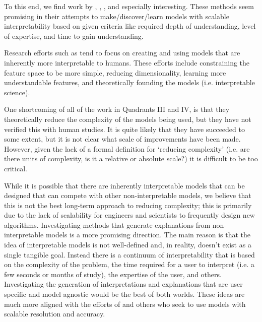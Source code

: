     To this end, we find work by \cite{Ruping2006-xj}, \cite{Van_Belle2012-dt}, \cite{Ribeiro2016-uc}, and \cite{Choi2016-by} especially interesting. These methods seem promising in their attempts to make/discover/learn models with scalable interpretability based on given criteria like required depth of understanding, level of expertise, and time to gain understanding. 
    
    Research efforts such as \cite{Caruana2015-za,Huysmans2011-th,Faghmous2014-og,Venna2007-yj,Vellido2012-nm,Kadous1999-rx,Lomas2012-ie} tend to focus on creating and using models that are inherently more interpretable to humans. These efforts include constraining the feature space to be more simple, reducing dimensionality, learning more understandable features, and theoretically founding the models (i.e. interpretable science).

    One shortcoming of all of the work in Quadrants III and IV, is that they theoretically reduce the complexity of the models being used, but they have not verified this with human studies. It is quite likely that they have succeeded to some extent, but it is not clear what scale of improvements have been made. However, given the lack of a formal definition for `reducing complexity' (i.e. are there units of complexity, is it a relative or absolute scale?) it is difficult to be too critical.
    
    While it is possible that there are inherently interpretable models that can be designed that can compete with other non-interpretable models, we believe that this is not the best long-term approach to reducing complexity; this is primarily due to the lack of scalability for engineers and scientists to frequently design new algorithms. Investigating methods that generate explanations from non-interpretable models is a more promising direction. The main reason is that the idea of interpretable models is not well-defined and, in reality, doesn't exist as a single tangible goal. Instead there is a continuum of interpretability that is based on the complexity of the problem, the time required for a user to interpret (i.e. a few seconds or months of study), the expertise of the user, and others. Investigating the generation of interpretations and explanations that are user specific and model agnostic would be the best of both worlds. These ideas are much more aligned with the efforts of \cite{Ruping2006-xj} and others who seek to use models with scalable resolution and accuracy.

